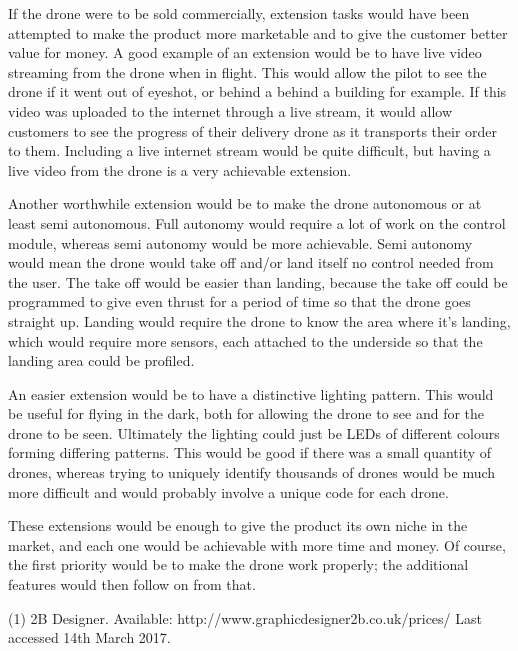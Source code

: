 \documentclass[a4paper]{article}
\begin{document}
If the drone were to be sold commercially, extension tasks would have been attempted to make the product more marketable and to give the customer better value for money. A good example of an extension would be to have live video streaming from the drone when in flight. This would allow the pilot to see the drone if it went out of eyeshot, or behind a behind a building for example. If this video was uploaded to the internet through a live stream, it would allow customers to see the progress of their delivery drone as it transports their order to them. Including a live internet stream would be quite difficult, but having a live video from the drone is a very achievable extension.

Another worthwhile extension would be to make the drone autonomous or at least semi autonomous. Full autonomy would require a lot of work on the control module, whereas semi autonomy would be more achievable. Semi autonomy would mean the drone would take off and/or land itself no control needed from the user. The take off would be easier than landing, because the take off could be programmed to give even thrust for a period of time so that the drone goes straight up. Landing would require the drone to know the area where it’s landing, which would require more sensors, each attached to the underside so that the landing area could be profiled.

An easier extension would be to have a distinctive lighting pattern. This would be useful for flying in the dark, both for allowing the drone to see and for the drone to be seen. Ultimately the lighting could just be LEDs of different colours forming differing patterns. This would be good if there was a small quantity of drones, whereas trying to uniquely identify thousands of drones would be much more difficult and would probably involve a unique code for each drone.

These extensions would be enough to give the product its own niche in the market, and each one would be achievable with more time and money. Of course, the first priority would be to make the drone work properly; the additional features would then follow on from that.

(1)	2B Designer. Available: http://www.graphicdesigner2b.co.uk/prices/ Last accessed 14th March 2017.
\end{document}
